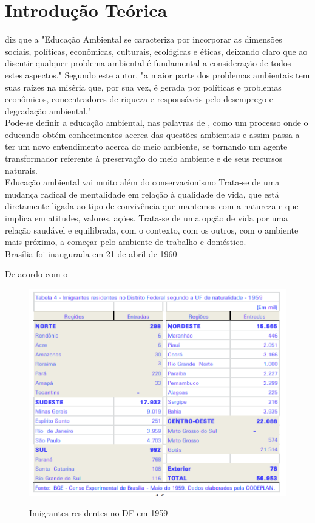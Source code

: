 \chapter{Introdução Teórica}

  diz que a "Educação Ambiental se caracteriza por
incorporar as dimensões sociais, políticas, econômicas,
culturais, ecológicas e éticas, deixando claro que ao discutir
qualquer problema ambiental é fundamental a consideração
de todos estes aspectos." Segundo este autor, "a maior parte
dos problemas ambientais tem suas raízes na miséria que,
por sua vez, é gerada por políticas e problemas econômicos,
concentradores de riqueza e responsáveis pelo desemprego
e degradação ambiental."\\

Pode-se definir a educação ambiental, nas palavras de , como um processo
onde o educando obtém conhecimentos acerca das
questões ambientais e assim passa a ter um novo
entendimento acerca do meio ambiente, se tornando um
agente transformador referente à preservação do meio
ambiente e de seus recursos naturais. \\

 Educação ambiental vai muito além do conservacionismo
Trata-se de uma mudança radical de mentalidade em
relação à qualidade de vida, que está diretamente ligada
ao tipo de convivência que mantemos com a natureza e
que implica em atitudes, valores, ações. Trata-se de uma
opção de vida por uma relação saudável e equilibrada,
com o contexto, com os outros, com o ambiente mais
próximo, a começar pelo ambiente de trabalho e
doméstico.\\


Brasília foi inaugurada em 21 de abril de 1960

De acordo com o 

\begin{figure}[h]
    \centering
    \includegraphics[width=0.7\linewidth]{fig/imigrantes-1959}
    \label{fig:imigrantes-1959}
    \caption{Imigrantes residentes no DF em 1959}
\end{figure}

